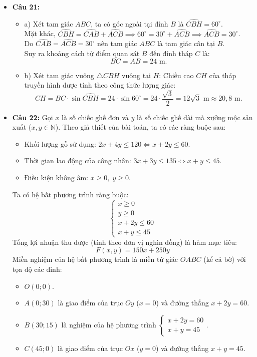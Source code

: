\documentclass[12pt,a4paper]{article}
\begin{document}
\begin{itemize}[leftmargin=0.6cm]
    \item \textbf{Câu 21:}
    \begin{itemize}
        \item a) Xét tam giác $ABC$, ta có góc ngoài tại đỉnh $B$ là $\widehat{CBH} = 60^\circ$.\\
        Mặt khác, $\widehat{CBH} = \widehat{CAB} + \widehat{ACB} \implies 60^\circ = 30^\circ + \widehat{ACB} \implies \widehat{ACB} = 30^\circ$.\\
        Do $\widehat{CAB} = \widehat{ACB} = 30^\circ$ nên tam giác $ABC$ là tam giác cân tại $B$.\\
        Suy ra khoảng cách từ điểm quan sát $B$ đến đỉnh tháp $C$ là:
        \[ BC = AB = 24\text{ m}. \]
        \item b) Xét tam giác vuông $\triangle CBH$ vuông tại $H$:
        Chiều cao $CH$ của tháp truyền hình được tính theo công thức lượng giác:
        \[ CH = BC \cdot \sin \widehat{CBH} = 24 \cdot \sin 60^\circ = 24 \cdot \dfrac{\sqrt{3}}{2} = 12\sqrt{3}\text{ m} \approx 20,8\text{ m}. \]
    \end{itemize}

    \item \textbf{Câu 22:}
    Gọi $x$ là số chiếc ghế đơn và $y$ là số chiếc ghế dài mà xưởng mộc sản xuất ($x, y \in \mathbb{N}$).
    Theo giả thiết của bài toán, ta có các ràng buộc sau:
    \begin{itemize}
        \item Khối lượng gỗ sử dụng: $2x + 4y \le 120 \iff x + 2y \le 60$.
        \item Thời gian lao động của công nhân: $3x + 3y \le 135 \iff x + y \le 45$.
        \item Điều kiện không âm: $x \ge 0,\; y \ge 0$.
    \end{itemize}
    Ta có hệ bất phương trình ràng buộc:
    \[ \begin{cases} x \ge 0 \\ y \ge 0 \\ x + 2y \le 60 \\ x + y \le 45 \end{cases} \]
    Tổng lợi nhuận thu được (tính theo đơn vị nghìn đồng) là hàm mục tiêu:
    \[ F(x, y) = 150x + 250y \]
    Miền nghiệm của hệ bất phương trình là miền tứ giác $OABC$ (kể cả bờ) với tọa độ các đỉnh:
    \begin{itemize}
        \item $O(0; 0)$.
        \item $A(0; 30)$ là giao điểm của trục $Oy$ ($x = 0$) và đường thẳng $x + 2y = 60$.
        \item $B(30; 15)$ là nghiệm của hệ phương trình $\begin{cases} x + 2y = 60 \\ x + y = 45 \end{cases}$.
        \item $C(45; 0)$ là giao điểm của trục $Ox$ ($y = 0$) và đường thẳng $x + y = 45$.
    \end{itemize}


\end{itemize}
\end{document}

